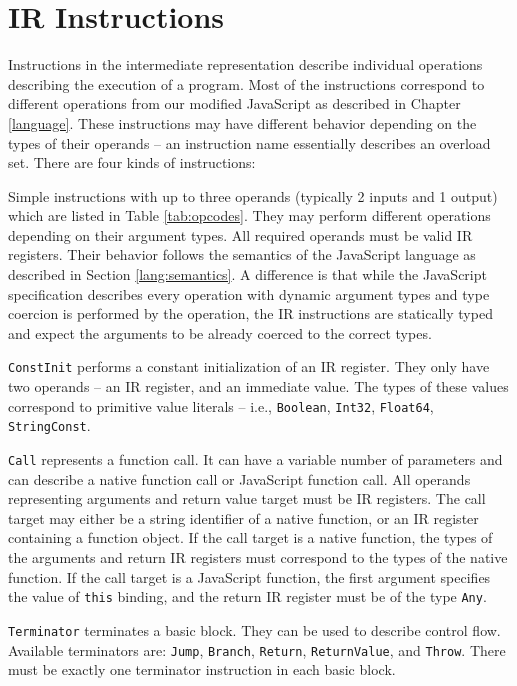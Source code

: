 \section{IR Instructions}

Instructions in the intermediate representation describe individual operations describing the execution of a program. Most of the instructions correspond to different operations from our modified JavaScript as described in Chapter \ref{language}. These instructions may have different behavior depending on the types of their operands -- an instruction name essentially describes an overload set. There are four kinds of instructions:


Simple instructions with up to three operands (typically 2 inputs and 1 output) which are listed in Table \ref{tab:opcodes}. They may perform different operations depending on their argument types. All required operands must be valid IR registers. Their behavior follows the semantics of the JavaScript language as described in Section \ref{lang:semantics}. A difference is that while the JavaScript specification describes every operation with dynamic argument types and type coercion is performed by the operation, the IR instructions are statically typed and expect the arguments to be already coerced to the correct types.

\texttt{ConstInit} performs a constant initialization of an IR register. They only have two operands -- an IR register, and an immediate value. The types of these values correspond to primitive value literals -- i.e., \texttt{Boolean}, \texttt{Int32}, \texttt{Float64}, \texttt{StringConst}.

\texttt{Call} represents a function call. It can have a variable number of parameters and can describe a native function call or JavaScript function call. All operands representing arguments and return value target must be IR registers. The call target may either be a string identifier of a native function, or an IR register containing a function object. If the call target is a native function, the types of the arguments and return IR registers must correspond to the types of the native function. If the call target is a JavaScript function, the first argument specifies the value of \texttt{this} binding, and the return IR register must be of the type \texttt{Any}.

\texttt{Terminator} terminates a basic block. They can be used to describe control flow. Available terminators are: \texttt{Jump}, \texttt{Branch}, \texttt{Return}, \texttt{ReturnValue}, and \texttt{Throw}. There must be exactly one terminator instruction in each basic block.

